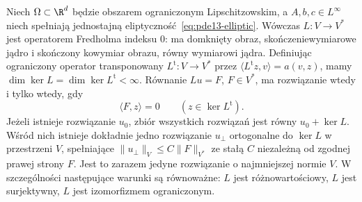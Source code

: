 \begin{twierdzenie}
\label{thm:pde13-fredholm}
Niech $\Omega\subset\R^d$ będzie obszarem ograniczonym Lipschitzowskim, a $A,b,c\in L^\infty$ niech spełniają
jednostajną eliptyczność~\eqref{eq:pde13-elliptic}.
Wówczas $L:V\to V^*$ jest operatorem Fredholma indeksu $0$:
ma domknięty obraz, skończeniewymiarowe jądro i skończony
kowymiar obrazu, równy wymiarowi jądra.
Definiując ograniczony operator transponowany
$L^{\mathrm t}:V\to V^*$ przez
$\langle L^{\mathrm t}z,v\rangle=a(v,z)$, mamy
$\dim\ker L=\dim\ker L^{\mathrm t}<\infty$.
Równanie $Lu=F$, $F\in V^*$, ma rozwiązanie wtedy i tylko wtedy, gdy
\begin{equation}\label{eq:pde13-compat}
 \langle F,z\rangle=0\qquad(z\in\ker L^{\mathrm t}).
\end{equation}
Jeżeli istnieje rozwiązanie $u_0$, zbiór wszystkich rozwiązań
jest równy $u_0+\ker L$. Wśród nich istnieje dokładnie jedno
rozwiązanie $u_\perp$ ortogonalne do $\ker L$ w przestrzeni $V$,
spełniające $\|u_\perp\|_V\le C\|F\|_{V^*}$ ze stałą $C$
niezależną od zgodnej prawej strony $F$.
Jest to zarazem jedyne rozwiązanie o najmniejszej normie $V$.
W szczególności następujące warunki są równoważne:
$L$ jest różnowartościowy, $L$ jest surjektywny,
$L$ jest izomorfizmem ograniczonym.
\end{twierdzenie}
